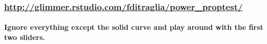 \documentclass[handout]{beamer}
\begin{document}
\begin{frame}
	\frametitle{\href{http://glimmer.rstudio.com/fditraglia/power_proptest/}{http://glimmer.rstudio.com/fditraglia/power\_proptest/}}
\framesubtitle{Ignore everything except the solid curve and play around with the first two sliders.}

\begin{figure}
\end{figure}

\end{frame}
\end{document}
